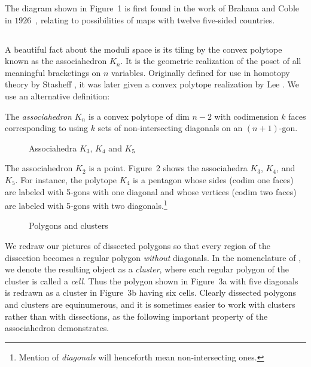 \documentclass[10pt]{amsart}
\begin{document}
\begin{figure}[h]
\caption{}
\label{m05}
\end{figure}

\begin{rem}
The diagram shown in Figure~1 is first found in the work of Brahana and Coble in $1926$~\cite[\S1]{bc}, relating to possibilities of maps with twelve five-sided countries.
\end{rem}


\subsection{}
A beautiful fact about the moduli space is its tiling by the convex polytope known as the associahedron $K_n$.  It is the geometric realization of the poset of all meaningful bracketings on $n$ variables.  Originally defined for use in homotopy theory by Stasheff \cite[\S2]{jds}, it was later given a convex polytope realization by Lee \cite{lee}. We use an alternative definition:

\begin{defn}
The {\em associahedron} $K_n$ is a convex polytope of dim $n-2$ with codimension $k$ faces corresponding to using $k$ sets of non-intersecting diagonals on an $(n+1)$-gon.
\end{defn}

\begin{figure}[h]
\caption{Associahedra $K_3$, $K_4$ and $K_5$}
\label{k3k4k5}
\end{figure}

\begin{exmp}
The associahedron $K_2$ is a point. Figure~2 shows the associahedra $K_3$, $K_4$, and $K_5$. For instance, the polytope $K_4$ is a pentagon whose sides (codim one faces) are labeled with 5-gons with one diagonal and whose vertices (codim two faces) are labeled with 5-gons with two diagonals.\footnote{Mention of {\em diagonals} will henceforth mean non-intersecting ones.} 
\end{exmp}

\begin{figure}[h]
\caption{Polygons and clusters}
\label{cluster}
\end{figure}

We redraw our pictures of dissected polygons so that every region of the dissection becomes a regular polygon {\em without} diagonals. In the nomenclature of \cite{r1}, we denote the resulting object as a {\em cluster}, where each regular polygon of the cluster is called a {\em cell}. Thus the polygon shown in Figure~3a with five diagonals is redrawn as a cluster in Figure~3b having six cells. Clearly dissected polygons and clusters are equinumerous, and it is sometimes easier to work with clusters rather than with dissections, as the following important property of the associahedron demonstrates.
\end{document}
